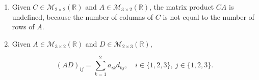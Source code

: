 \begin{enumerate}[label=\Alph*)]
\begin{answer}
                $$\begin{aligned}
                    (AC)_{11}
                        &= \sum_{k=1}^{2} a_{1k}c_{k1}
                        = 2(2)+2(3) = 10, \\[0.5em]
                    (AC)_{12}
                        &= \sum_{k=1}^{2} a_{1k}c_{k2}
                        = 2(-1)+2(0) = -2, \\[0.5em]
                    (AC)_{21}
                        &= \sum_{k=1}^{2} a_{2k}c_{k1}
                        = 3(2)+3(3) = 15, \\[0.5em]
                    (AC)_{22}
                        &= \sum_{k=1}^{2} a_{2k}c_{k2}
                        = 3(-1)+3(0) = -3, \\[0.5em]
                    (AC)_{31}
                        &= \sum_{k=1}^{2} a_{3k}c_{k1}
                        = (-1)(2)+(-1)(3) = -5, \\[0.5em]
                    (AC)_{32}
                        &= \sum_{k=1}^{2} a_{3k}c_{k2}
                        = (-1)(-1)+(-1)(0) = 1 \implies \\[0.5em]
                    \implies
                    AC & = \begin{bmatrix}
                        10 & -2 \\
                        15 & -3 \\
                        -5 & 1
                    \end{bmatrix}
                \end{aligned}$$
            \end{answer}
            \item \begin{ranswer} %
                Given $C \in \mathcal{M}_{2\times2}(\mathbb{R})$ and
                $A \in \mathcal{M}_{3\times2}(\mathbb{R})$,
                the matrix product $CA$ is undefined, because the number of columns of $C$ is not equal to the number of rows of $A$.
            \end {ranswer}
            \item \begin{answer} %
                Given $A \in \mathcal{M}_{3\times2}(\mathbb{R})$ and
                $D \in \mathcal{M}_{2\times3}(\mathbb{R})$,

                $$(AD)_{ij} = \sum_{k=1}^{2} a_{ik}d_{kj},
                    \quad
                    i \in \{1,2,3\},\ j \in \{1,2,3\}.$$


\end{answer}
\end{enumerate}
